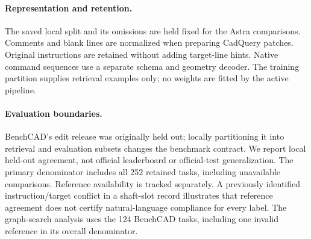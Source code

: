 \paragraph{Representation and retention.}
The saved local split and its omissions are held fixed for the Astra comparisons. Comments and blank lines are normalized when preparing CadQuery patches. Original instructions are retained without adding target-line hints. Native command sequences use a separate schema and geometry decoder. The training partition supplies retrieval examples only; no weights are fitted by the active pipeline.

\paragraph{Evaluation boundaries.}
BenchCAD's edit release was originally held out; locally partitioning it into retrieval and evaluation subsets changes the benchmark contract. We report local held-out agreement, not official leaderboard or official-test generalization. The primary denominator includes all 252 retained tasks, including unavailable comparisons. Reference availability is tracked separately. A previously identified instruction/target conflict in a shaft-slot record illustrates that reference agreement does not certify natural-language compliance for every label. The graph-search analysis uses the 124 BenchCAD tasks, including one invalid reference in its overall denominator.
